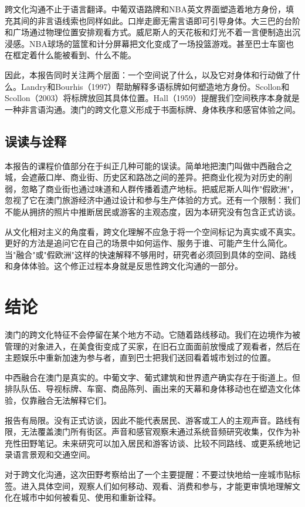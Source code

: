 \documentclass[12pt,a4paper]{article}
\begin{document}
跨文化沟通不止于语言翻译。中葡双语路牌和NBA英文界面塑造着地方身份，填充其间的非言语线索也同样如此。口岸走廊无需言语即可引导身体。大三巴的台阶和广场通过物理位置安排观看方式。威尼斯人的天花板和灯光不着一言便制造出沉浸感。NBA球场的篮筐和计分屏幕把文化变成了一场投篮游戏。甚至巴士车窗也在框定着什么能被看到、什么不能。

因此，本报告同时关注两个层面：一个空间说了什么，以及它对身体和行动做了什么。Landry和Bourhis（1997）帮助解释多语标牌如何塑造地方身份。Scollon和Scollon（2003）将标牌放回其具体位置。Hall（1959）提醒我们空间秩序本身就是一种非言语沟通。澳门的跨文化意义形成于书面标牌、身体秩序和感官体验之间。

\subsection{误读与诠释}

本报告的课程价值部分在于纠正几种可能的误读。简单地把澳门叫做中西融合之城，会遮蔽口岸、商业街、历史区和路氹之间的差异。把商业化视为对历史的削弱，忽略了商业街也通过味道和人群传播着遗产地标。把威尼斯人叫作"假欧洲"，忽视了它在澳门旅游经济中通过设计和参与生产体验的方式。还有一个限制：我们不能从拥挤的照片中推断居民或游客的主观态度，因为本研究没有包含正式访谈。

从文化相对主义的角度看，跨文化理解不应急于将一个空间标记为真实或不真实。更好的方法是追问它在自己的场景中如何运作、服务于谁、可能产生什么简化。当"融合"或"假欧洲"这样的快速解释不够用时，研究者必须回到具体的空间、路线和身体体验。这个修正过程本身就是反思性跨文化沟通的一部分。

\section{结论}

澳门的跨文化特征不会停留在某个地方不动。它随着路线移动。我们在边境作为被管理的对象进入，在美食街变成了买家，在旧石立面面前放慢成了观看者，然后在主题娱乐中重新加速为参与者，直到巴士把我们送回看着城市划过的位置。

中西融合在澳门是真实的。中葡文字、葡式建筑和世界遗产确实存在于街道上。但排队队伍、导视标牌、车窗、商品陈列、画出来的天幕和身体移动也在塑造文化体验，仅靠融合无法解释它们。

报告有局限。没有正式访谈，因此不能代表居民、游客或工人的主观声音。路线有限，无法覆盖澳门所有街区。声音和感官观察未通过系统音频研究收集，仅作为补充性田野笔记。未来研究可以加入居民和游客访谈、比较不同路线、或更系统地记录语言景观和交通空间。

对于跨文化沟通，这次田野考察给出了一个主要提醒：不要过快地给一座城市贴标签。进入具体空间，观察人们如何移动、观看、消费和参与，才能更审慎地理解文化在城市中如何被看见、使用和重新诠释。
\end{document}
